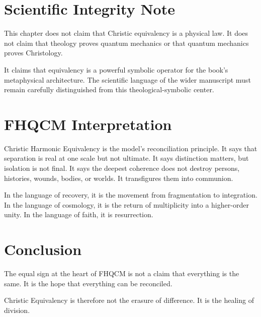 \section{Scientific Integrity Note}

This chapter does not claim that Christic equivalency is a physical law. It does not claim that theology proves quantum mechanics or that quantum mechanics proves Christology.

It claims that equivalency is a powerful symbolic operator for the book's metaphysical architecture. The scientific language of the wider manuscript must remain carefully distinguished from this theological-symbolic center.

\section{FHQCM Interpretation}

Christic Harmonic Equivalency is the model's reconciliation principle. It says that separation is real at one scale but not ultimate. It says distinction matters, but isolation is not final. It says the deepest coherence does not destroy persons, histories, wounds, bodies, or worlds. It transfigures them into communion.

In the language of recovery, it is the movement from fragmentation to integration. In the language of cosmology, it is the return of multiplicity into a higher-order unity. In the language of faith, it is resurrection.

\section{Conclusion}

The equal sign at the heart of FHQCM is not a claim that everything is the same. It is the hope that everything can be reconciled.

Christic Equivalency is therefore not the erasure of difference. It is the healing of division.
